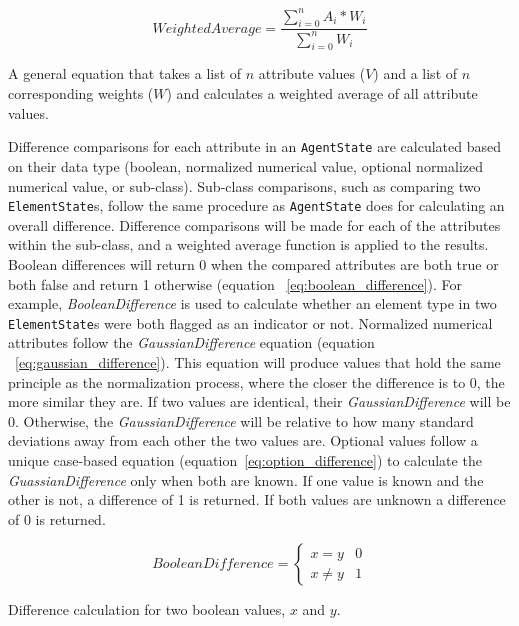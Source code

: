 \begin{capeq}
  \begin{equation} \label{eq:weighted_average}
    WeightedAverage = \frac{\sum_{i=0}^{n} A_{i} * W_{i}}{\sum_{i=0}^{n} W_{i}}
  \end{equation}
  \caption[Weighted Average]{A general equation that takes a list of $n$ attribute values ($V$) and a list of $n$ corresponding weights ($W$) and calculates a weighted average of all attribute values.}
\end{capeq}

Difference comparisons for each attribute in an \texttt{AgentState} are calculated based on their data type (boolean, normalized numerical value, optional normalized numerical value, or sub-class).
Sub-class comparisons, such as comparing two \texttt{ElementState}s, follow the same procedure as \texttt{AgentState} does for calculating an overall difference.
Difference comparisons will be made for each of the attributes within the sub-class, and a weighted average function is applied to the results.
Boolean differences will return 0 when the compared attributes are both true or both false and return 1 otherwise (equation ~\ref{eq:boolean_difference}).
For example, \textit{BooleanDifference} is used to calculate whether an element type in two \texttt{ElementState}s were both flagged as an indicator or not.
Normalized numerical attributes follow the \textit{GaussianDifference} equation (equation ~\ref{eq:gaussian_difference}).
This equation will produce values that hold the same principle as the normalization process, where the closer the difference is to 0, the more similar they are.
If two values are identical, their \textit{GaussianDifference} will be 0.
Otherwise, the \textit{GaussianDifference} will be relative to how many standard deviations away from each other the two values are.
Optional values follow a unique case-based equation (equation~\ref{eq:option_difference}) to calculate the \textit{GuassianDifference} only when both are known.
If one value is known and the other is not, a difference of 1 is returned.
If both values are unknown a difference of 0 is returned.

\begin{capeq}
\begin{equation} \label{eq:boolean_difference}
  BooleanDifference = \begin{cases}
    x = y & 0 \\
    x \neq y & 1
  \end{cases}
\end{equation}
\caption[Boolean Difference]{Difference calculation for two boolean values, $x$ and $y$.}
\end{capeq}

